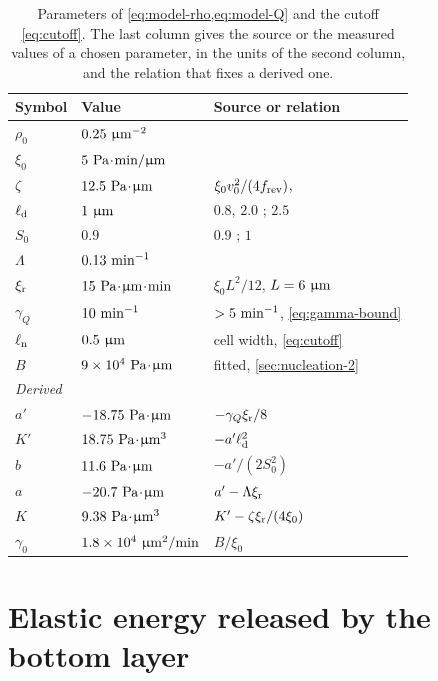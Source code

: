 \documentclass[aps,pre,reprint,superscriptaddress,longbibliography,nofootinbib
]{revtex4-2}
\begin{document}
\begin{table}[h!]
\centering
\footnotesize
\begin{tabular}{l l l}
\hline
Symbol & Value & Source or relation \\
\hline
$\rho_0$ & $0.25~\micron^{-2}$ & \cite{copenhagen2021} \\
$\xi_0$ & $5~\Pa\tcdot\minute/\micron$ & \cite{han2025local} \\
$\zeta$ & $12.5~\Pa\tcdot\micron$ & $\xi_0v_0^2/(4\frev)$, \cite{copenhagen2021,liu2019selfdriven} \\
$\elld$ & $1~\micron$ & $0.8$, $2.0$ \cite{han2025local}; $2.5$ \cite{copenhagen2021} \\
$S_0$ & $0.9$ & $0.9$ \cite{han2025local}; $1$ \cite{copenhagen2021} \\
$\Lambda$ & $0.13~\minute^{-1}$ & \cite{liu2019selfdriven} \\
$\xir$ & $15~\Pa\tcdot\micron\tcdot\minute$ & $\xi_0L^2/12$, $L=6~\micron$ \\
$\gamma_Q$ & $10~\minute^{-1}$ & $>5~\minute^{-1}$, \cref{eq:gamma-bound} \\
$\elln$ & $0.5~\micron$ & cell width, \cref{eq:cutoff} \\
$B$ & $9\times10^4~\Pa\tcdot\micron$ & fitted, \cref{sec:nucleation-2} \\
\multicolumn{3}{l}{\textit{Derived}} \\
$a'$ & $-18.75~\Pa\tcdot\micron$ & $-\gamma_Q\xir/8$ \\
$K'$ & $18.75~\Pa\tcdot\micron^3$ & $-a'\elld^2$ \\
$b$ & $11.6~\Pa\tcdot\micron$ & $-a'/(2S_0^2)$ \\
$a$ & $-20.7~\Pa\tcdot\micron$ & $a'-\Lambda\xir$ \\
$K$ & $9.38~\Pa\tcdot\micron^3$ & $K'-\zeta\xir/(4\xi_0)$ \\
$\gamma_0$ & $1.8\times10^4~\micron^2/\minute$ & $B/\xi_0$ \\
\hline
\end{tabular}
\caption{Parameters of \cref{eq:model-rho,eq:model-Q} and the cutoff \cref{eq:cutoff}.
  The last column gives the source or the measured values of a chosen parameter, in the
  units of the second column, and the relation that fixes a derived one.}
\label{tab:field-params}
\end{table}


\section{Elastic energy released by the bottom layer}
\label{app:extrusion}
\end{document}
